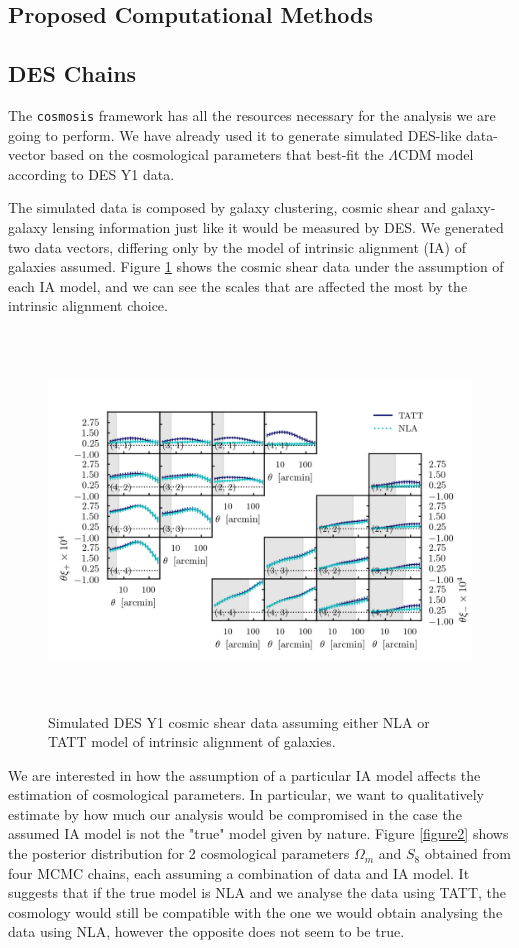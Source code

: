 \documentclass[12pt]{article}
\begin{document}
\begin{small}
\section{Proposed Computational Methods}
\subsection{DES Chains}

The {\tt cosmosis} framework has all the resources necessary for the analysis we are going to perform. We have already used it to generate simulated DES-like data-vector based on the cosmological parameters that best-fit the $\Lambda$CDM model according to DES Y1 data. 

The simulated data is composed by galaxy clustering, cosmic shear and galaxy-galaxy lensing information just like it would be measured by DES. We generated two data vectors, differing only by the model of intrinsic alignment (IA) of galaxies assumed. Figure \ref{figure1} shows the cosmic shear data under the assumption of each IA model, and we can see the scales that are affected the most by the intrinsic alignment choice.
 
\begin{figure}[!h]
\begin{center}
\includegraphics[height=10cm]{xipm_NLA_TATT.png}
\end{center}
 \caption{Simulated DES Y1 cosmic shear data assuming either NLA or TATT model of intrinsic alignment of galaxies.}
\label{figure1}
\end{figure}

We are interested in how the assumption of a particular IA model affects the estimation of cosmological parameters. In particular, we want to qualitatively estimate by how much our analysis would be compromised in the case the assumed IA model is not the "true" model given by nature. Figure \ref{figure2} shows the posterior distribution for 2 cosmological parameters $\Omega_m$ and $S_8$ obtained from four MCMC chains, each assuming a combination of data and IA model. It suggests that if the true model is NLA and we analyse the data using TATT, the cosmology would still be compatible with the one we would obtain analysing the data using NLA, however the opposite does not seem to be true.


\end{small}
\end{document}
